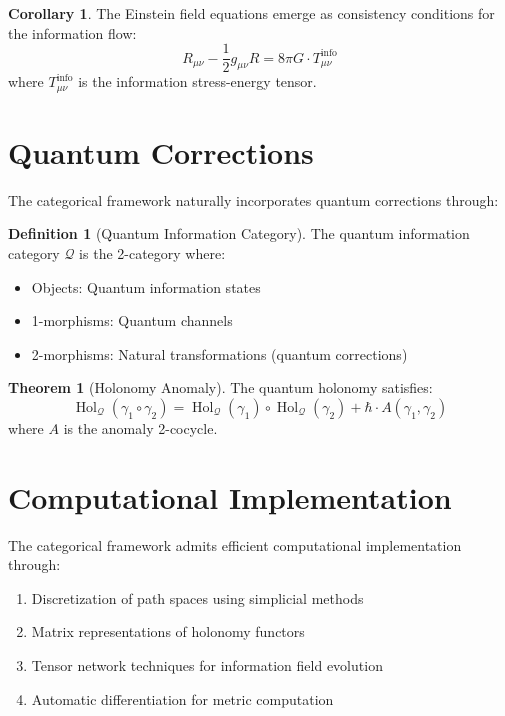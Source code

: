 \documentclass[11pt]{article}
\theoremstyle{definition}
\newtheorem{definition}{Definition}
\newtheorem{theorem}{Theorem}
\newtheorem{corollary}{Corollary}
\DeclareMathOperator{\Hol}{Hol}
\begin{document}
\begin{corollary}
The Einstein field equations emerge as consistency conditions for the information flow:
$$R_{\mu\nu} - \frac{1}{2}g_{\mu\nu}R = 8\pi G \cdot T_{\mu\nu}^{\text{info}}$$
where $T_{\mu\nu}^{\text{info}}$ is the information stress-energy tensor.
\end{corollary}

\section{Quantum Corrections}

The categorical framework naturally incorporates quantum corrections through:

\begin{definition}[Quantum Information Category]
The quantum information category $\mathcal{Q}$ is the 2-category where:
\begin{itemize}
\item Objects: Quantum information states
\item 1-morphisms: Quantum channels
\item 2-morphisms: Natural transformations (quantum corrections)
\end{itemize}
\end{definition}

\begin{theorem}[Holonomy Anomaly]
The quantum holonomy satisfies:
$$\Hol_{\mathcal{Q}}(\gamma_1 \circ \gamma_2) = \Hol_{\mathcal{Q}}(\gamma_1) \circ \Hol_{\mathcal{Q}}(\gamma_2) + \hbar \cdot A(\gamma_1, \gamma_2)$$
where $A$ is the anomaly 2-cocycle.
\end{theorem}

\section{Computational Implementation}

The categorical framework admits efficient computational implementation through:

\begin{enumerate}
\item Discretization of path spaces using simplicial methods
\item Matrix representations of holonomy functors
\item Tensor network techniques for information field evolution
\item Automatic differentiation for metric computation
\end{enumerate}
\end{document}
